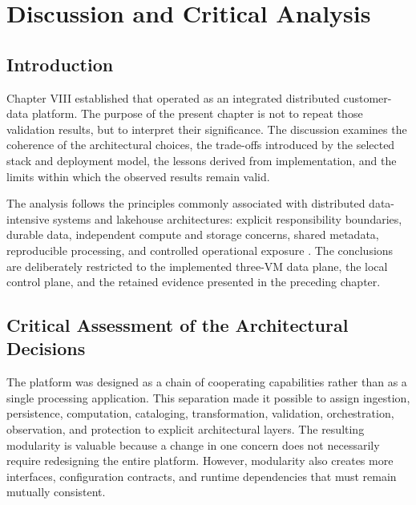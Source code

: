 \chapter{Discussion and Critical Analysis}

\section{Introduction}
Chapter VIII established that \projectname{} operated as an integrated distributed customer-data platform. The purpose of the present chapter is not to repeat those validation results, but to interpret their significance. The discussion examines the coherence of the architectural choices, the trade-offs introduced by the selected stack and deployment model, the lessons derived from implementation, and the limits within which the observed results remain valid.

The analysis follows the principles commonly associated with distributed data-intensive systems and lakehouse architectures: explicit responsibility boundaries, durable data, independent compute and storage concerns, shared metadata, reproducible processing, and controlled operational exposure \cite{kleppmann2017ddia,armbrust2021lakehouse}. The conclusions are deliberately restricted to the implemented three-VM data plane, the local control plane, and the retained evidence presented in the preceding chapter.

\section{Critical Assessment of the Architectural Decisions}
The platform was designed as a chain of cooperating capabilities rather than as a single processing application. This separation made it possible to assign ingestion, persistence, computation, cataloging, transformation, validation, orchestration, observation, and protection to explicit architectural layers. The resulting modularity is valuable because a change in one concern does not necessarily require redesigning the entire platform. However, modularity also creates more interfaces, configuration contracts, and runtime dependencies that must remain mutually consistent.

